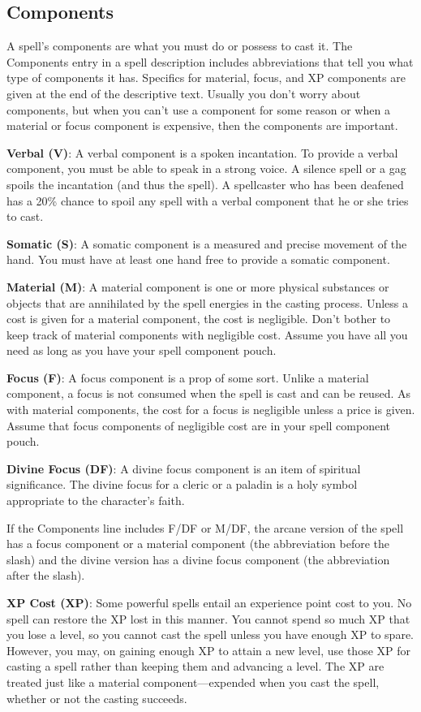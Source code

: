\subsection{Components}
A spell's components are what you must do or possess to cast it. The Components entry in a spell description includes abbreviations that tell you what type of components it has. Specifics for material, focus, and XP components are given at the end of the descriptive text. Usually you don't worry about components, but when you can't use a component for some reason or when a material or focus component is expensive, then the components are important.

\textbf{Verbal (V)}: A verbal component is a spoken incantation. To provide a verbal component, you must be able to speak in a strong voice. A silence spell or a gag spoils the incantation (and thus the spell). A spellcaster who has been deafened has a 20\% chance to spoil any spell with a verbal component that he or she tries to cast.

\textbf{Somatic (S)}: A somatic component is a measured and precise movement of the hand. You must have at least one hand free to provide a somatic component.

\textbf{Material (M)}: A material component is one or more physical substances or objects that are annihilated by the spell energies in the casting process. Unless a cost is given for a material component, the cost is negligible. Don't bother to keep track of material components with negligible cost. Assume you have all you need as long as you have your spell component pouch.

\textbf{Focus (F)}: A focus component is a prop of some sort. Unlike a material component, a focus is not consumed when the spell is cast and can be reused. As with material components, the cost for a focus is negligible unless a price is given. Assume that focus components of negligible cost are in your spell component pouch.

\textbf{Divine Focus (DF)}: A divine focus component is an item of spiritual significance. The divine focus for a cleric or a paladin is a holy symbol appropriate to the character's faith.

If the Components line includes F/DF or M/DF, the arcane version of the spell has a focus component or a material component (the abbreviation before the slash) and the divine version has a divine focus component (the abbreviation after the slash).

\textbf{XP Cost (XP)}: Some powerful spells entail an experience point cost to you. No spell can restore the XP lost in this manner. You cannot spend so much XP that you lose a level, so you cannot cast the spell unless you have enough XP to spare. However, you may, on gaining enough XP to attain a new level, use those XP for casting a spell rather than keeping them and advancing a level. The XP are treated just like a material component---expended when you cast the spell, whether or not the casting succeeds.